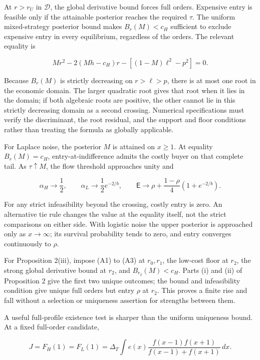 \documentclass[
  11pt,
]{article}
\begin{document}
At \(r>r_U\) in \(\mathcal D\), the global derivative bound forces full
orders. Expensive entry is feasible only if the attainable posterior
reaches the required \(\tau\). The uniform mixed-strategy posterior
bound makes \(B_r(M)<c_H\) sufficient to exclude expensive entry in
every equilibrium, regardless of the orders. The relevant equality is

\[
Mr^2-2(Mh-c_H)r-[(1-M)\ell^2-p^2]=0.
\tag{OA.20}\label{eq:oa-oa-20}
\]

Because \(B_r(M)\) is strictly decreasing on \(r>\ell>p\), there is at
most one root in the economic domain. The larger quadratic root gives
that root when it lies in the domain; if both algebraic roots are
positive, the other cannot lie in this strictly decreasing domain as a
second crossing. Numerical specifications must verify the discriminant,
the root residual, and the support and floor conditions rather than
treating the formula as globally applicable.

For Laplace noise, the posterior \(M\) is attained on \(x\ge1\). At
equality \(B_r(M)=c_H\), entry-at-indifference admits the costly buyer
on that complete tail. As \(\tau\uparrow M\), the flow threshold
approaches unity and

\[
\alpha_H\to\frac12,\qquad \alpha_L\to\frac12e^{-2/b},\qquad
\mathsf E\to\rho+\frac{1-\rho}{4}(1+e^{-2/b}).
\tag{OA.21}\label{eq:oa-oa-21}
\]

For any strict infeasibility beyond the crossing, costly entry is zero.
An alternative tie rule changes the value at the equality itself, not
the strict comparisons on either side. With logistic noise the upper
posterior is approached only as \(x\to\infty\); its survival probability
tends to zero, and entry converges continuously to \(\rho\).

For Proposition 2(iii), impose (A1) to (A3) at \(r_0,r_1\), the low-cost
floor at \(r_2\), the strong global derivative bound at \(r_2\), and
\(B_{r_2}(M)<c_H\). Parts (i) and (ii) of Proposition 2 give the first
two unique outcomes; the bound and infeasibility condition give unique
full orders but entry \(\rho\) at \(r_2\). This proves a finite rise and
fall without a selection or uniqueness assertion for strengths between
them.

A useful full-profile existence test is sharper than the uniform
uniqueness bound. At a fixed full-order candidate,

\[
J=F_H(1)=F_L(1)
=\Delta_T\int e(x)\frac{f(x-1)f(x+1)}{f(x-1)+f(x+1)}\,dx.
\tag{OA.22}\label{eq:oa-oa-22}
\]
\end{document}
